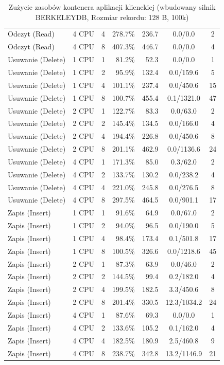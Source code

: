 \begin{table}[ht]
{\begin{tabular}{llcrrcc}
Odczyt (Read) & 4 CPU & 4 & 278.7\% & 236.7 & 0.0/0.0 & 2 \\
Odczyt (Read) & 4 CPU & 8 & 407.3\% & 446.7 & 0.0/0.0 & 4 \\
Usuwanie (Delete) & 1 CPU & 1 & 81.2\% & 52.3 & 0.0/0.0 & 1 \\
Usuwanie (Delete) & 1 CPU & 2 & 95.9\% & 132.4 & 0.0/159.6 & 5 \\
Usuwanie (Delete) & 1 CPU & 4 & 101.1\% & 237.4 & 0.0/450.6 & 15 \\
Usuwanie (Delete) & 1 CPU & 8 & 100.7\% & 455.4 & 0.1/1321.0 & 47 \\
Usuwanie (Delete) & 2 CPU & 1 & 122.7\% & 83.3 & 0.0/63.0 & 2 \\
Usuwanie (Delete) & 2 CPU & 2 & 145.4\% & 134.5 & 0.0/166.0 & 4 \\
Usuwanie (Delete) & 2 CPU & 4 & 194.4\% & 226.8 & 0.0/450.6 & 8 \\
Usuwanie (Delete) & 2 CPU & 8 & 201.1\% & 462.9 & 0.0/1136.6 & 24 \\
Usuwanie (Delete) & 4 CPU & 1 & 171.3\% & 85.0 & 0.3/62.0 & 2 \\
Usuwanie (Delete) & 4 CPU & 2 & 133.7\% & 130.2 & 0.0/238.2 & 4 \\
Usuwanie (Delete) & 4 CPU & 4 & 221.0\% & 245.8 & 0.0/276.5 & 8 \\
Usuwanie (Delete) & 4 CPU & 8 & 297.5\% & 464.5 & 0.0/901.1 & 17 \\
Zapis (Insert) & 1 CPU & 1 & 91.6\% & 64.9 & 0.0/67.0 & 2 \\
Zapis (Insert) & 1 CPU & 2 & 94.0\% & 96.5 & 0.0/190.0 & 5 \\
Zapis (Insert) & 1 CPU & 4 & 98.4\% & 173.4 & 0.1/501.8 & 17 \\
Zapis (Insert) & 1 CPU & 8 & 100.5\% & 326.6 & 0.0/1218.6 & 45 \\
Zapis (Insert) & 2 CPU & 1 & 87.3\% & 63.9 & 0.0/46.0 & 2 \\
Zapis (Insert) & 2 CPU & 2 & 144.5\% & 99.4 & 0.2/182.0 & 4 \\
Zapis (Insert) & 2 CPU & 4 & 199.5\% & 182.5 & 3.3/450.6 & 8 \\
Zapis (Insert) & 2 CPU & 8 & 201.4\% & 330.5 & 12.3/1034.2 & 24 \\
Zapis (Insert) & 4 CPU & 1 & 87.6\% & 69.3 & 0.0/0.0 & 1 \\
Zapis (Insert) & 4 CPU & 2 & 133.6\% & 105.2 & 0.1/162.0 & 4 \\
Zapis (Insert) & 4 CPU & 4 & 182.5\% & 180.9 & 2.5/460.8 & 9 \\
Zapis (Insert) & 4 CPU & 8 & 238.7\% & 342.8 & 13.2/1146.9 & 21 \\
\bottomrule
\end{tabular}%
}
\caption{Zużycie zasobów kontenera aplikacji klienckiej (wbudowany silnik BERKELEYDB, Rozmiar rekordu: 128 B, 100k)}
\label{tab:resources_berkeleydb_small_100000}
\end{table}
